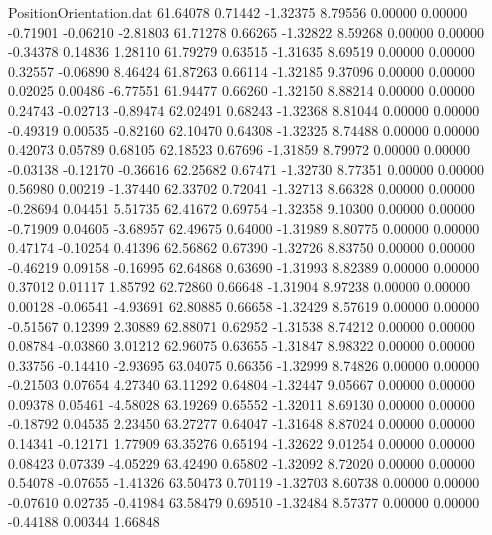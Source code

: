 \begin{filecontents}{PositionOrientation.dat}
  61.64078    0.71442   -1.32375     8.79556    0.00000    0.00000   -0.71901   -0.06210   -2.81803
  61.71278    0.66265   -1.32822     8.59268    0.00000    0.00000   -0.34378    0.14836    1.28110
  61.79279    0.63515   -1.31635     8.69519    0.00000    0.00000    0.32557   -0.06890    8.46424
  61.87263    0.66114   -1.32185     9.37096    0.00000    0.00000    0.02025    0.00486   -6.77551
  61.94477    0.66260   -1.32150     8.88214    0.00000    0.00000    0.24743   -0.02713   -0.89474
  62.02491    0.68243   -1.32368     8.81044    0.00000    0.00000   -0.49319    0.00535   -0.82160
  62.10470    0.64308   -1.32325     8.74488    0.00000    0.00000    0.42073    0.05789    0.68105
  62.18523    0.67696   -1.31859     8.79972    0.00000    0.00000   -0.03138   -0.12170   -0.36616
  62.25682    0.67471   -1.32730     8.77351    0.00000    0.00000    0.56980    0.00219   -1.37440
  62.33702    0.72041   -1.32713     8.66328    0.00000    0.00000   -0.28694    0.04451    5.51735
  62.41672    0.69754   -1.32358     9.10300    0.00000    0.00000   -0.71909    0.04605   -3.68957
  62.49675    0.64000   -1.31989     8.80775    0.00000    0.00000    0.47174   -0.10254    0.41396
  62.56862    0.67390   -1.32726     8.83750    0.00000    0.00000   -0.46219    0.09158   -0.16995
  62.64868    0.63690   -1.31993     8.82389    0.00000    0.00000    0.37012    0.01117    1.85792
  62.72860    0.66648   -1.31904     8.97238    0.00000    0.00000    0.00128   -0.06541   -4.93691
  62.80885    0.66658   -1.32429     8.57619    0.00000    0.00000   -0.51567    0.12399    2.30889
  62.88071    0.62952   -1.31538     8.74212    0.00000    0.00000    0.08784   -0.03860    3.01212
  62.96075    0.63655   -1.31847     8.98322    0.00000    0.00000    0.33756   -0.14410   -2.93695
  63.04075    0.66356   -1.32999     8.74826    0.00000    0.00000   -0.21503    0.07654    4.27340
  63.11292    0.64804   -1.32447     9.05667    0.00000    0.00000    0.09378    0.05461   -4.58028
  63.19269    0.65552   -1.32011     8.69130    0.00000    0.00000   -0.18792    0.04535    2.23450
  63.27277    0.64047   -1.31648     8.87024    0.00000    0.00000    0.14341   -0.12171    1.77909
  63.35276    0.65194   -1.32622     9.01254    0.00000    0.00000    0.08423    0.07339   -4.05229
  63.42490    0.65802   -1.32092     8.72020    0.00000    0.00000    0.54078   -0.07655   -1.41326
  63.50473    0.70119   -1.32703     8.60738    0.00000    0.00000   -0.07610    0.02735   -0.41984
  63.58479    0.69510   -1.32484     8.57377    0.00000    0.00000   -0.44188    0.00344    1.66848

\end{filecontents}
